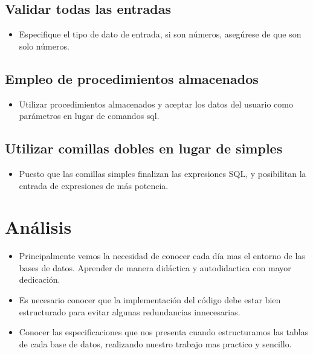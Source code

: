 \documentclass[%
 reprint,
 amsmath,amssymb,
 aps,
]{revtex4-1}
\begin{document}
\begin{itemize}
\subsection {Validar todas las entradas}
\begin{itemize}
\item Especifique el tipo de dato de entrada, si son números,
asegúrese de que son solo números.
\end{itemize}
\subsection {Empleo de procedimientos almacenados}
\begin{itemize}
\item Utilizar procedimientos almacenados y aceptar los datos
del usuario como parámetros en lugar de comandos sql.
\end{itemize}
\subsection {Utilizar comillas dobles en lugar de simples}
\begin{itemize}
\item Puesto que las comillas simples finalizan las expresiones
SQL, y posibilitan la entrada de expresiones de más
potencia.
\end{itemize}
\end{itemize}
\section{Análisis}

\begin{itemize}
	\item Principalmente vemos la necesidad de conocer cada día mas el entorno de las bases de datos. Aprender de manera didáctica y autodidactica con mayor dedicación.

\item Es necesario conocer que la implementación del código debe estar bien estructurado para evitar algunas redundancias innecesarias.

\item Conocer las especificaciones que nos presenta cuando estructuramos las tablas de cada base de datos, realizando nuestro trabajo mas practico y sencillo.
\end{itemize}
\end{document}
